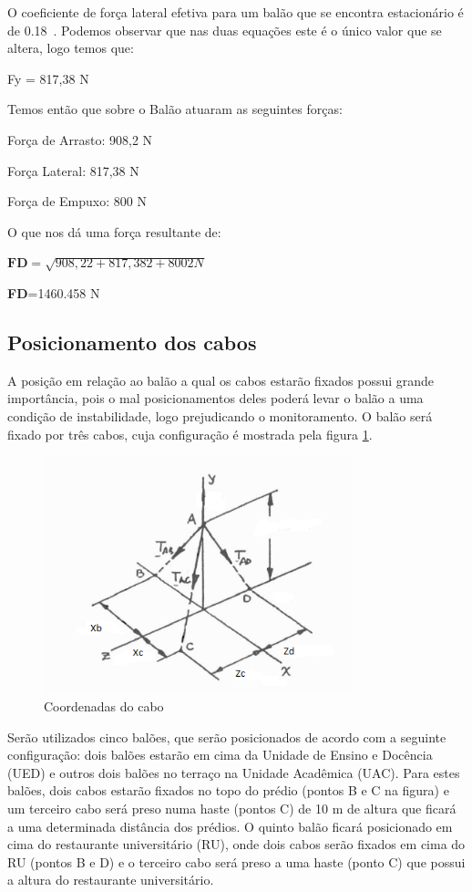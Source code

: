 	O coeficiente de força lateral efetiva para um balão que se encontra estacionário é de 0.18~\cite{ferguson}. Podemos observar que nas duas equações este é o único valor que se altera, logo temos que:

	Fy = 817,38 N

	Temos então que sobre o Balão atuaram as seguintes forças:

	Força de Arrasto: 908,2 N

	Força Lateral: 817,38 N

	Força de Empuxo: 800 N

	O que nos dá uma força resultante de:

	$\textbf{FD}= \sqrt{908,22+ 817,382+8002N}$

	\textbf{FD}=1460.458 N

\subsection{Posicionamento dos cabos}

	A posição em relação ao balão a qual os cabos estarão fixados possui grande importância, pois o mal posicionamentos deles poderá levar o balão a uma condição de instabilidade, logo prejudicando o monitoramento. O balão será fixado por três cabos, cuja  configuração é mostrada pela figura \ref{img:coordcabos}.

	\begin{figure}[H]
		\centering
		\includegraphics[width=0.8\textwidth]{figuras/coorcabo}
		\caption[Coordenadas do cabo]{Coordenadas do cabo~\cite{beer}}
		\label{img:coordcabos}
	\end{figure}

	Serão utilizados cinco balões, que serão posicionados de acordo com a seguinte configuração: dois balões estarão em cima da Unidade de Ensino e Docência (UED) e outros dois balões no terraço na Unidade Acadêmica (UAC). Para estes balões, dois cabos estarão fixados no topo do prédio (pontos B e C na figura) e um terceiro cabo será preso numa haste (pontos C) de 10 m de altura que ficará a uma determinada distância dos prédios. O quinto balão ficará posicionado em cima do restaurante universitário (RU), onde dois cabos serão fixados em cima do RU (pontos B e D) e o terceiro cabo será preso a uma haste (ponto C) que possui a altura do restaurante universitário.

